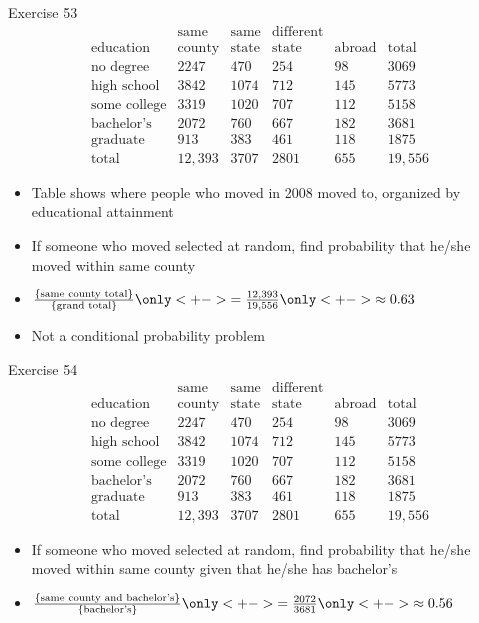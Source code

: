 \documentclass[handout]{beamer}
\theoremstyle{definition}
\begin{document}
\begin{frame}{Exercise 53}
\[\begin{array}{r|llll|l}
&\text{same}&\text{same}&\text{different}&&\\
\text{education}&\text{county}
&\text{state}&\text{state}&\text{abroad}&\text{total}\\\hline
\text{no degree}&2247&470&254&98&3069\\
\text{high school}&3842&1074&712&145&5773\\
\text{some college}&3319&1020&707&112&5158\\
\text{bachelor's}&2072&760&667&182&3681\\
\text{graduate}&913&383&461&118&1875\\\hline
\text{total}&12,393&3707&2801&655&19,556
\end{array}\]
\begin{itemize}
\item Table shows where people who moved in 2008
moved to, organized by educational attainment
\item If someone who moved selected at random, find probability
that he/she moved within same county
\item $\frac{\left\{\text{same county total}\right\}}
{\left\{\text{grand total}\right\}}
\only<+->{=\frac{12,393}{19,556}}\only<+->{\approx 0.63}$
\item Not a conditional probability problem
\end{itemize}
\end{frame}

\begin{frame}{Exercise 54}
\[\begin{array}{r|llll|l}
&\text{same}&\text{same}&\text{different}&&\\
\text{education}&\text{county}
&\text{state}&\text{state}&\text{abroad}&\text{total}\\\hline
\text{no degree}&2247&470&254&98&3069\\
\text{high school}&3842&1074&712&145&5773\\
\text{some college}&3319&1020&707&112&5158\\
\text{bachelor's}&2072&760&667&182&3681\\
\text{graduate}&913&383&461&118&1875\\\hline
\text{total}&12,393&3707&2801&655&19,556
\end{array}\]
\begin{itemize}
\item If someone who moved selected at random, find probability
that he/she moved within same county given that he/she has bachelor's
\item $\frac{\left\{\text{same county and bachelor's}\right\}}
{\left\{\text{bachelor's}\right\}}
\only<+->{=\frac{2072}{3681}}\only<+->{\approx 0.56}$
\end{itemize}
\end{frame}
\end{document}
